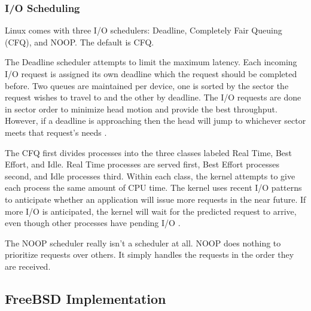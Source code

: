\documentclass[onecolumn,draftclsnofoot, 10pt, compsoc]{IEEEtran}
\begin{document}
		\subsubsection{I/O Scheduling}
			Linux comes with three I/O schedulers: Deadline, Completely Fair Queuing (CFQ), and NOOP. The default is CFQ.
	
			The Deadline scheduler attempts to limit the maximum latency. 
			Each incoming I/O request is assigned its own deadline which the request should be completed before.
			Two queues are maintained per device, one is sorted by the sector the request wishes to travel to and the other by deadline. 
			The I/O requests are done in sector order to minimize head motion and provide the best throughput. However, if a deadline is approaching then the head will jump to whichever sector meets that request's needs \cite{linuxSChed}.
	
			The CFQ first divides processes into the three classes labeled Real Time, Best Effort, and Idle. 
			Real Time processes are served first, Best Effort processes second, and Idle processes third. 
			Within each class, the kernel attempts to give each process the same amount of CPU time. 
			The kernel uses recent I/O patterns to anticipate whether an application will issue more requests in the near future.
			If more I/O is anticipated, the kernel will wait for the predicted request to arrive, even though other processes have pending I/O \cite{linuxSChed}.
			
			The NOOP scheduler really isn't a scheduler at all. 
			NOOP does nothing to prioritize requests over others.
			It simply handles the requests in the order they are received.
	
	\subsection{FreeBSD Implementation}
\end{document}
